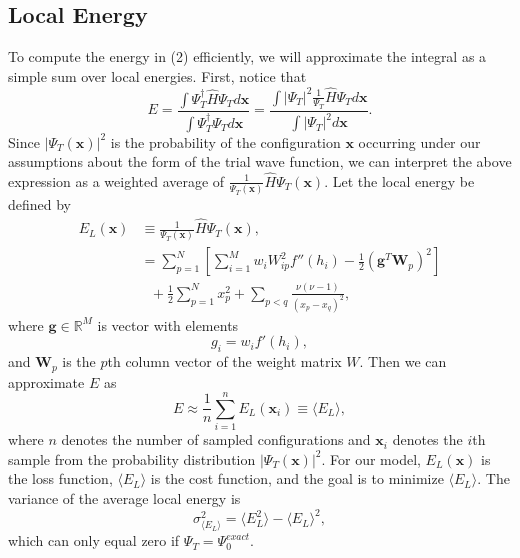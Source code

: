 \documentclass[prb,aps,twocolumn,showpacs,10pt]{revtex4-1}
\begin{document}

\subsection{Local Energy}

To compute the energy in (2) efficiently, we will approximate the integral as a simple sum over local energies. First, notice that
\begin{equation}
E = \frac{\int \Psi^\dag_T \hat{H} \Psi_T d \bm{x} }{\int \Psi_T^\dag \Psi_T d \bm{x} } = \frac{\int |\Psi_T|^2 \frac{1}{\Psi_T} \hat{H} \Psi_T d \bm{x} }{\int |\Psi_T|^2 d \bm{x} }.
\end{equation}
Since $|\Psi_T(\bm{x})|^2$ is the probability of the configuration $\bm{x}$ occurring under our assumptions about the form of the trial wave function, we can interpret the above expression as a weighted average of $\frac{1}{\Psi_T(\bm{x})} \hat{H} \Psi_T(\bm{x})$. Let the local energy be defined by
\begin{align}
E_L(\bm{x}) &\equiv \frac{1}{\Psi_T(\bm{x})} \hat{H} \Psi_T(\bm{x}),\\
&= \sum_{p=1}^N \left[ \sum_{i=1}^M w_i W_{ip}^2 f''(h_i) - \frac{1}{2} \left( \bm{g}^T \bm{W}_p \right)^2 \right]\\
& \ \ \ + \frac{1}{2} \sum_{p=1}^N x_p^2 + \sum_{p<q} \frac{\nu(\nu-1)}{(x_p-x_q)^2},
\end{align}
where $\bm{g}\in \mathbb{R}^M$ is vector with elements 
\begin{equation}
g_i = w_i f'(h_i),
\end{equation}
and $\bm{W}_p$ is the $p$th column vector of the weight matrix $W$. Then we can approximate $E$ as
\begin{equation}
E \approx \frac{1}{n} \sum_{i = 1}^n E_L(\bm{x}_i) \equiv \langle E_L \rangle,
\end{equation}
where $n$ denotes the number of sampled configurations and $\bm{x}_i$ denotes the $i$th sample from the probability distribution $|\Psi_T(\bm{x})|^2$. For our model, $E_L(\bm{x})$ is the loss function, $\langle E_L \rangle$ is the cost function, and the goal is to minimize $\langle E_L \rangle$. The variance of the average local energy is
\begin{equation}
\sigma_{\langle E_L \rangle}^2 = \langle E_L^2 \rangle - \langle E_L \rangle^2,
\end{equation}
which can only equal zero if $\Psi_T = \Psi_0^{exact}$.
\end{document}
